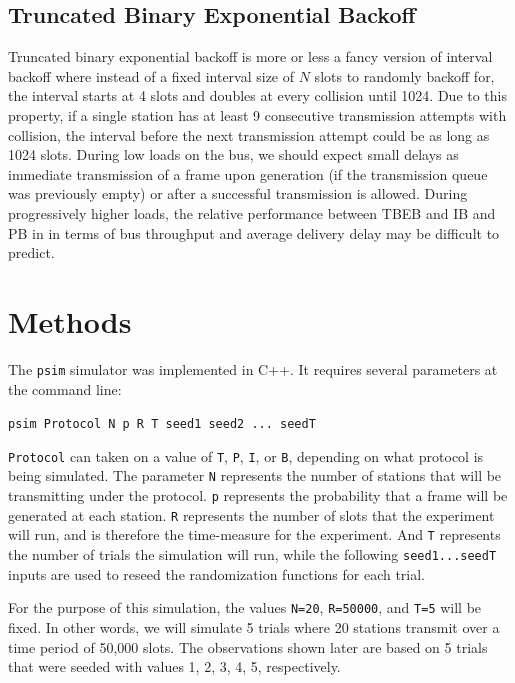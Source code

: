 \documentclass[twocolumn]{article}
\begin{document}
\subsection*{Truncated Binary Exponential Backoff}

Truncated binary exponential backoff is more or less a fancy version of interval backoff 
where instead of a fixed interval size of $N$ slots to randomly backoff for, the interval
starts at 4 slots and doubles at every collision until 1024. Due to this property, if a
single station has at least 9 consecutive transmission attempts with collision, 
the interval before the next transmission attempt could be as long as 1024 slots. During low
loads on the bus, we should expect small delays as immediate transmission of a frame upon 
generation (if the transmission queue was previously empty) or after a successful transmission
is allowed. During progressively higher loads, the relative performance between TBEB and IB and PB in
in terms of bus throughput and average delivery delay may be difficult to predict. 

\section*{Methods}

The \verb|psim| simulator was implemented in C++. It requires several parameters
at the command line:

\begin{center}\verb|psim Protocol N p R T seed1 seed2 ... seedT|\end{center}

 \verb|Protocol| can taken on a value of \verb|T|, \verb|P|, \verb|I|, or \verb|B|, depending on
what protocol is being simulated. The parameter \verb|N| represents the number of
stations that will be transmitting under the protocol. \verb|p| represents the
probability that a frame will be generated at each station. \verb|R| represents the
number of slots that the experiment will run, and is therefore the time-measure
for the experiment. And \verb|T| represents the number of trials the simulation will
run, while the following \verb|seed1...seedT| inputs are used to reseed the
randomization functions for each trial. 

For the purpose of this simulation, the
values \verb|N=20|, \verb|R=50000|, and \verb|T=5| will be fixed. In other words, we will
simulate 5 trials where 20 stations transmit over a time period of 50,000 slots.
The observations shown later are based on 5 trials that were seeded with values
1, 2, 3, 4, 5, respectively.
\end{document}
